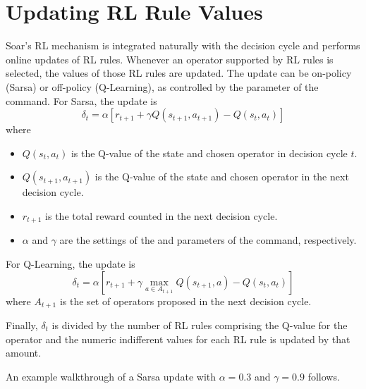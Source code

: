 \section{Updating RL Rule Values}
\label{RL-algo}

Soar's RL mechanism is integrated naturally with the decision cycle and performs online updates of RL rules.
Whenever an operator supported by RL rules is selected, the values of those RL rules are updated.
The update can be on-policy (Sarsa) or off-policy (Q-Learning), as controlled by the  parameter of the  command.
For Sarsa, the update is
$$ \delta_t = \alpha \left[ r_{t+1} + \gamma Q(s_{t+1}, a_{t+1}) - Q(s_t, a_t) \right] $$
where 
\begin{itemize}
\item $Q(s_t, a_t)$ is the Q-value of the state and chosen operator in decision cycle $t$.
\item $Q(s_{t+1}, a_{t+1})$ is the Q-value of the state and chosen operator in the next decision cycle.
\item $r_{t+1}$ is the total reward counted in the next decision cycle.
\item $\alpha$ and $\gamma$ are the settings of the  and  parameters of the  command, respectively.
\end{itemize}

For Q-Learning, the update is
$$ \delta_t = \alpha \left[ r_{t+1} + \gamma \underset{a \in A_{t+1}}{\max} Q(s_{t+1}, a) - Q(s_t, a_t) \right] $$
where $A_{t+1}$ is the set of operators proposed in the next decision cycle.

Finally, $\delta_t$ is divided by the number of RL rules comprising the Q-value for the operator and the numeric indifferent values for each RL rule is updated by that amount.

An example walkthrough of a Sarsa update with $\alpha = 0.3$ and $\gamma = 0.9$ follows.

